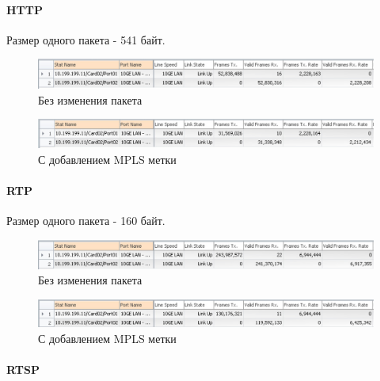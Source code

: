 \paragraph{HTTP}

Размер одного пакета - 541 байт.

\begin{figure}
\centering
\includegraphics[scale=0.6]{pictures/http_output}
\caption{Без изменения пакета}
\label{pic:http_output}
\end{figure}

\begin{figure}[h]
\centering
\includegraphics[scale=0.6]{pictures/http_mpls_output}
\caption{С добавлением MPLS метки}
\label{pic:http_mpls_output}
\end{figure}

\paragraph{RTP}

Размер одного пакета - 160 байт.

\begin{figure}
\centering
\includegraphics[scale=0.6]{pictures/rtp_output}
\caption{Без изменения пакета}
\label{pic:rtp_output}
\end{figure}

\begin{figure}
\centering
\includegraphics[scale=0.6]{pictures/rtp_mpls_output}
\caption{С добавлением MPLS метки}
\label{pic:rtp_mpls_output}
\end{figure}

\paragraph{RTSP}

